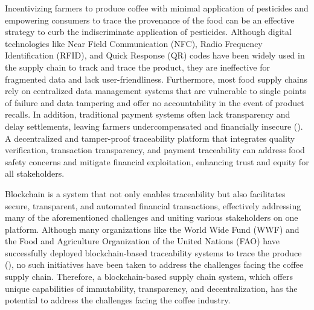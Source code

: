 \documentclass[12pt]{article}
\begin{document}
	
	
	
	
	Incentivizing farmers to produce coffee with minimal application of pesticides and empowering consumers to trace the provenance of the food can be an effective strategy to curb the indiscriminate application of pesticides. Although digital technologies like Near Field Communication (NFC), Radio Frequency Identification (RFID), and Quick Response (QR) codes have been widely used in the supply chain to track and trace the product, they are ineffective for fragmented data and lack user-friendliness. Furthermore, most food supply chains rely on centralized data management systems that are vulnerable to single points of failure and data tampering and offer no accountability in the event of product recalls. In addition, traditional payment systems often lack transparency and delay settlements, leaving farmers undercompensated and financially insecure (\cite{anveshana_india_coffee_2019}). A decentralized and tamper-proof traceability platform that integrates quality verification, transaction transparency, and payment traceability can address food safety concerns and mitigate financial exploitation, enhancing trust and equity for all stakeholders.
	
	Blockchain is a system that not only enables traceability but also facilitates secure, transparent, and automated financial transactions, effectively addressing many of the aforementioned challenges and uniting various stakeholders on one platform. Although many organizations like the World Wide Fund (WWF) and the Food and Agriculture Organization of the United Nations (FAO) have successfully deployed blockchain-based traceability systems to trace the produce (\citet{world_wildlife_fund_wwf_wwf_2019}), no such initiatives have been taken to address the challenges facing the coffee supply chain. Therefore, a blockchain-based supply chain system, which offers unique capabilities of immutability, transparency, and decentralization, has the potential to address the challenges facing the coffee industry.
	
\end{document}
